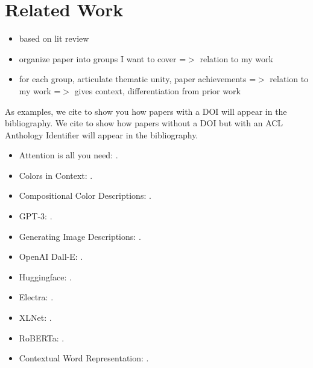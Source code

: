 \section{Related Work}

\begin{itemize}
  \item based on lit review
  \item organize paper into groups I want to cover =$>$ relation to my work
  \item for each group, articulate thematic unity, paper achievements =$>$ relation to my work =$>$ gives context, differentiation from prior work
\end{itemize}

As examples, we cite \citep{vaswani-2017-attention} to show you how papers with a DOI will appear in the bibliography.
We cite \citep{monroe-2017-colors} to show how papers without a DOI but with an ACL Anthology Identifier will appear in the bibliography.

\begin{itemize}
  \item Attention is all you need: \citep{vaswani-2017-attention}.
  \item Colors in Context: \citep{monroe-2017-colors}.
  \item Compositional Color Descriptions: \citep{monroe-2016-compositional}.
  \item GPT-3: \citep{brown-2020-gpt3}.
  \item Generating Image Descriptions: \citep{karpathy-2014-image_descriptions}.
  \item OpenAI Dall-E: \citep{openai-2020-dalle}.
  \item Huggingface: \citep{wolf-2019-huggingface}.
  \item Electra: \citep{clark-2020-electra}.
  \item XLNet: \citep{yang-2019-xlnet}.
  \item RoBERTa: \citep{liu-2019-roberta}.
  \item Contextual Word Representation: \citep{smith-2019-contextual}.
\end{itemize}

